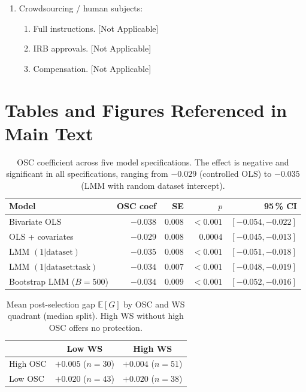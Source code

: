 \documentclass[twoside]{article}
\newcommand{\bE}{\mathbb{E}}
\begin{document}
\begin{enumerate}
  \item Crowdsourcing / human subjects:
  \begin{enumerate}
    \item Full instructions. [Not Applicable]
    \item IRB approvals. [Not Applicable]
    \item Compensation. [Not Applicable]
  \end{enumerate}

\end{enumerate}

\clearpage
\appendix
\thispagestyle{empty}
\onecolumn
{}

\section{Tables and Figures Referenced in Main Text}
\label{app:tables}

\begin{table}[h]
\centering
\caption{OSC coefficient across five model specifications. The effect is
negative and significant in all specifications, ranging from $-0.029$
(controlled OLS) to $-0.035$ (LMM with random dataset intercept).}
\label{tab:osc_coef}
\begin{tabular}{lrrrr}
\toprule
Model & OSC coef & SE & $p$ & 95\,\% CI \\
\midrule
Bivariate OLS & $-0.038$ & $0.008$ & ${<}0.001$ & $[-0.054, -0.022]$ \\
OLS + covariates & $-0.029$ & $0.008$ & $0.0004$ & $[-0.045, -0.013]$ \\
LMM $(1|\text{dataset})$ & $-0.035$ & $0.008$ & ${<}0.001$ & $[-0.051, -0.018]$ \\
LMM $(1|\text{dataset:task})$ & $-0.034$ & $0.007$ & ${<}0.001$ & $[-0.048, -0.019]$ \\
Bootstrap LMM ($B{=}500$) & $-0.034$ & $0.009$ & ${<}0.001$ & $[-0.052, -0.016]$ \\
\bottomrule
\end{tabular}
\end{table}

\begin{table}[h]
\centering
\caption{Mean post-selection gap $\bE[G]$ by OSC and WS quadrant (median
split). High WS without high OSC offers no protection.}
\label{tab:2x2}
\begin{tabular}{lcc}
\toprule
 & Low WS & High WS \\
\midrule
High OSC & $+0.005$ ($n=30$) & $+0.004$ ($n=51$) \\
Low OSC  & $+0.020$ ($n=43$) & $+0.020$ ($n=38$) \\
\bottomrule
\end{tabular}
\end{table}
\end{document}
